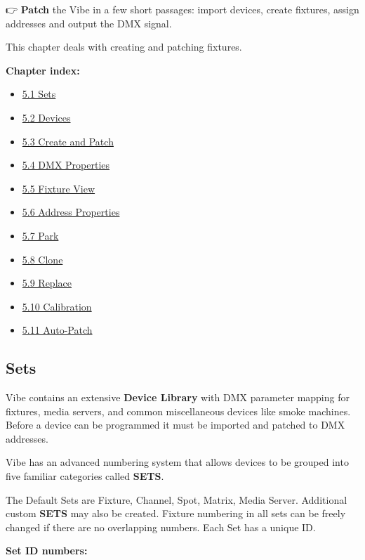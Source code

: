 \documentclass[
]{article}
\providecommand{\tightlist}{%
  \setlength{\itemsep}{0pt}\setlength{\parskip}{0pt}}
\begin{document}
👉 \textbf{Patch} the Vibe in a few short passages: import devices, create fixtures, assign addresses and output the DMX signal.

This chapter deals with creating and patching fixtures.

\textbf{Chapter index:}

\begin{itemize}
\tightlist
\item
  \protect\hyperlink{Sets-5.1}{5.1 Sets}
\item
  \protect\hyperlink{Devices-5.2}{5.2 Devices}
\item
  \protect\hyperlink{Create-and-Patch-5.3}{5.3 Create and Patch}
\item
  \protect\hyperlink{DMX-Properties-5.4}{5.4 DMX Properties}
\item
  \protect\hyperlink{Fixture-View-5.5}{5.5 Fixture View}
\item
  \protect\hyperlink{Address-Properties-5.6}{5.6 Address Properties}
\item
  \protect\hyperlink{Park-5.7}{5.7 Park}
\item
  \protect\hyperlink{Clone-5.8}{5.8 Clone}
\item
  \protect\hyperlink{Replace-5.9}{5.9 Replace}
\item
  \protect\hyperlink{Calibration-5.10}{5.10 Calibration}
\item
  \protect\hyperlink{Auto-Patch-5.11}{5.11 Auto-Patch}
\end{itemize}

\hypertarget{Sets-5.1}{%
\subsection{Sets}\label{Sets-5.1}}

Vibe contains an extensive \textbf{Device Library} with DMX parameter mapping for fixtures, media servers, and common miscellaneous devices like smoke machines.
Before a device can be programmed it must be imported and patched to DMX addresses.

Vibe has an advanced numbering system that allows devices to be grouped into five familiar categories called \textbf{SETS}.

The Default Sets are Fixture, Channel, Spot, Matrix, Media Server. Additional custom \textbf{SETS} may also be created. Fixture numbering in all sets can be freely changed if there are no overlapping numbers. Each Set has a unique ID.

\textbf{Set ID numbers:}
\end{document}
